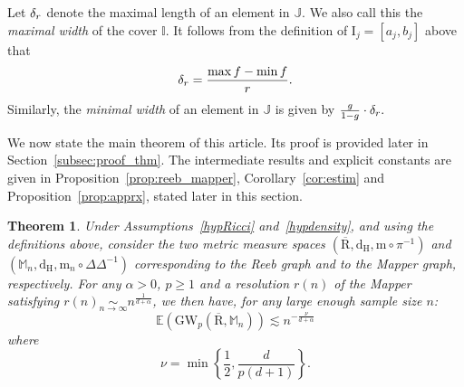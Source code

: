 \documentclass[pdflatex,sn-mathphys-ay]{sn-jnl}%
\newtheorem{theorem}{Theorem}[section]
\newcommand{\reeb}{\mathrm{R}}
\newcommand{\mes}{\mathrm{m}}
\newcommand{\gromov}{\mathrm{GW}}
\newcommand{\haus}{{\mathrm {d_H}}}
\newcommand{\interv}{{\mathrm {I}}}
\newcommand{\mapper}{{\mathbb{M}_n}}
\newcommand{\DD}{\Delta\!\!\!\!\Delta}
\newcommand{\diracn}{\mathrm{m}_n}
\newcommand{\coverwidth}{\change{\delta_r}}
\newcommand{\change}[1]{\noindent #1}
\theoremstyle{thmstyleone}%
\begin{document}
Let $\coverwidth$ denote the maximal length of an element in $\mathbb{J}$. We also call this the {\em maximal width} of the cover $\mathbb{I}$. It follows from the definition of $\interv_j=[a_j,b_j]$ above that
$$\coverwidth=\frac{\max f - \min f}{r}.$$ 
Similarly, the {\em minimal width} of an element in $\mathbb{J}$ is given by 
 $\frac{g}{1-g}\cdot\coverwidth.$ 

We now state the main theorem of this article. %
\change{Its proof is provided later in Section~\ref{subsec:proof_thm}.
The intermediate results and explicit constants are given in Proposition~\ref{prop:reeb_mapper}, Corollary~\ref{cor:estim} and Proposition~\ref{prop:apprx}, stated later in this section.}
\begin{theorem}\label{thm:main_result}
Under %
Assumptions~\ref{hypRicci} and~\ref{hypdensity}, and using the definitions above, 
consider the two metric measure spaces $(\overline{\reeb},\haus,\mes\circ\pi^{-1})$ and $(\mapper,\haus,\diracn\circ\DD^{-1})$ corresponding to the Reeb graph and to the Mapper graph, respectively.  
For any $\alpha>0$, $p \geq 1$ and a resolution $r(n)$ of the Mapper satisfying $r(n)\underset{n\rightarrow\infty}{\sim}n^{\frac{1}{d+\alpha}}$, we then have, for any large enough sample size $n$:
 $$\mathbb{E}\left(\gromov_p(\overline{\reeb},\mapper)\right)\lesssim n^{-\frac{\nu}{d+\alpha}} $$
 where $$\nu=\min\left\{\frac{1}{2},\frac{d}{p(d+1)}\right\}.$$ 
\end{theorem}
\end{document}

